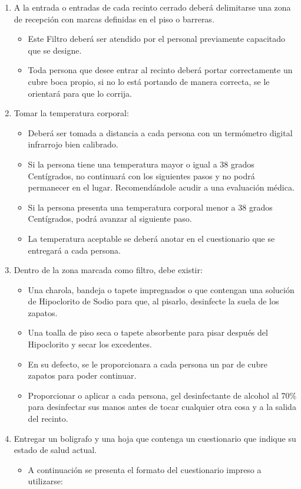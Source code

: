 \documentclass[]{article}
\providecommand{\tightlist}{%
  \setlength{\itemsep}{0pt}\setlength{\parskip}{0pt}}
\begin{document}
\begin{enumerate}
\def\labelenumi{\arabic{enumi}.}
\tightlist
\item
  A la entrada o entradas de cada recinto cerrado deberá delimitarse una
  zona de recepción con marcas definidas en el piso o barreras.

  \begin{itemize}
  \tightlist
  \item
    Este Filtro deberá ser atendido por el personal previamente
    capacitado que se designe.
  \item
    Toda persona que desee entrar al recinto deberá portar correctamente
    un cubre boca propio, si no lo está portando de manera correcta, se
    le orientará para que lo corrija.
  \end{itemize}
\item
  Tomar la temperatura corporal:

  \begin{itemize}
  \tightlist
  \item
    Deberá ser tomada a distancia a cada persona con un termómetro
    digital infrarrojo bien calibrado.
  \item
    Si la persona tiene una temperatura mayor o igual a 38 grados
    Centígrados, no continuará con los siguientes pasos y no podrá
    permanecer en el lugar. Recomendándole acudir a una evaluación
    médica.
  \item
    Si la persona presenta una temperatura corporal menor a 38 grados
    Centígrados, podrá avanzar al siguiente paso.
  \item
    La temperatura aceptable se deberá anotar en el cuestionario que se
    entregará a cada persona.
  \end{itemize}
\item
  Dentro de la zona marcada como filtro, debe existir:

  \begin{itemize}
  \tightlist
  \item
    Una charola, bandeja o tapete impregnados o que contengan una
    solución de Hipoclorito de Sodio para que, al pisarlo, desinfecte la
    suela de los zapatos.
  \item
    Una toalla de piso seca o tapete absorbente para pisar después del
    Hipoclorito y secar los excedentes.
  \item
    En su defecto, se le proporcionara a cada persona un par de cubre
    zapatos para poder continuar.
  \item
    Proporcionar o aplicar a cada persona, gel desinfectante de alcohol
    al 70\% para desinfectar sus manos antes de tocar cualquier otra
    cosa y a la salida del recinto.
  \end{itemize}
\item
  Entregar un boligrafo y una hoja que contenga un cuestionario que
  indique su estado de salud actual.

  \begin{itemize}
  \tightlist
  \item
    A continuación se presenta el formato del cuestionario impreso a
    utilizarse:
  \end{itemize}
\end{enumerate}
\end{document}
